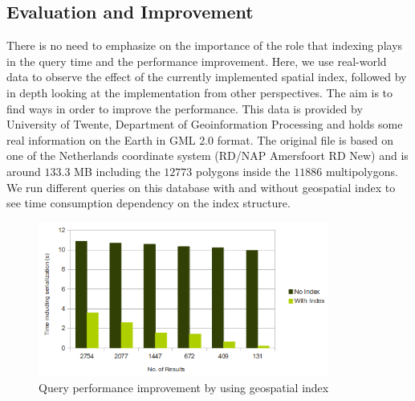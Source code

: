 \documentclass[a4paper,12pt]{article}
\begin{document}
\subsection{Evaluation and Improvement}
\label{BXevaluation}
There is no need to emphasize on the importance of the role that indexing plays in the query time and the performance improvement. Here, we use real-world data to observe the effect of the currently implemented spatial index, followed by in depth looking at the implementation from other perspectives. The aim is to find ways in order to improve the performance. This data is provided by University of Twente, Department of Geoinformation Processing and holds some real information on the Earth in GML 2.0 format. The original file is based on one of the Netherlands coordinate system (RD/NAP Amersfoort RD New) and is around $133.3$ MB including the $12773$ polygons inside the $11886$ multipolygons.
We run different queries on this database with and without geospatial index to see time consumption dependency on the index structure. 
\begin{figure}
\centering
\includegraphics[width=0.85\textwidth]{IndexEfficiency}
\caption{Query performance improvement by using geospatial index}
\label{figIndexEfficiency}
\end{figure}
\end{document}
